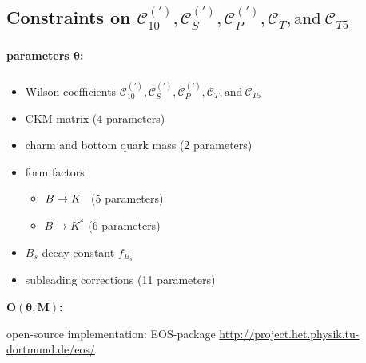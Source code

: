 \documentclass[english]{beamer}
\newcommand{\slide}[2][t]{\begin{frame}[#1] \frametitle{\insertsection} #2 \end{frame}}
\begin{document}
\subsection{Constraints on $\mathcal{C}_{10} ^{(\prime)} , \mathcal{C}_S ^{(\prime)} , \mathcal{C}_P ^{(\prime)} , \mathcal{C}_T , \text{and} ~ \mathcal{C}_{T5}$ }

\slide{

    {\large\textbf{parameters $\boldsymbol{\theta}$:}}

    \frametitle{\insertsubsectionhead}

    \begin{itemize}
        \item Wilson coefficients $\mathcal{C}_{10} ^{(\prime)} , \mathcal{C}_S ^{(\prime)} , \mathcal{C}_P ^{(\prime)} , \mathcal{C}_T , \text{and} ~ \mathcal{C}_{T5}$
        \item CKM matrix (4 parameters)
        \item charm and bottom quark mass (2 parameters)
        \item form factors
              \begin{itemize}
                  \item $B\rightarrow K^{\thinspace\thinspace\thinspace}$ (5 parameters)
                  \item $B\rightarrow K^\ast$                             (6 parameters)
              \end{itemize}
        \item $B_s$ decay constant $f_{B_s}$
        \item subleading corrections (11 parameters)
    \end{itemize}

    \vspace{5mm}

    {\large\textbf{$\boldsymbol{O(\theta , M)}$:}}

    \vspace{2.5mm}
    \Large open-source implementation: EOS-package \newline \large \url{http://project.het.physik.tu-dortmund.de/eos/}

}
\end{document}
